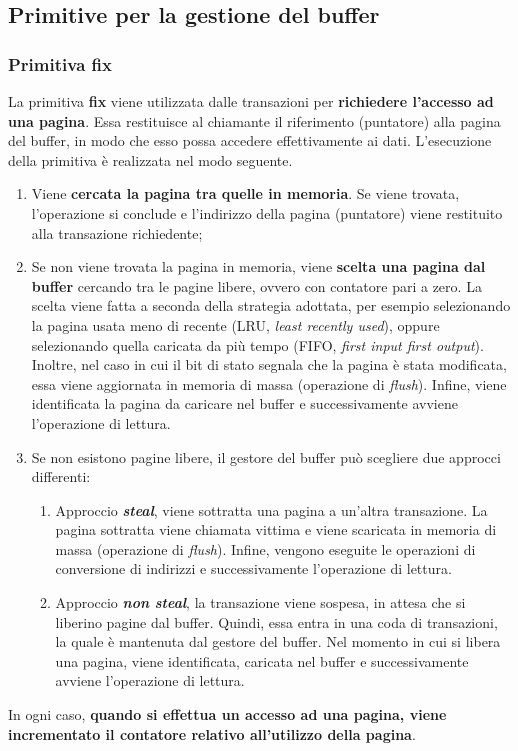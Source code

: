 \documentclass[a4paper]{article}
\begin{document}
	\subsection{Primitive per la gestione del buffer}
	
	\subsubsection{Primitiva \textsf{fix}}
	
	La primitiva \textcolor{Red3}{\textbf{\textsf{fix}}} viene utilizzata dalle transazioni per \textbf{richiedere l'accesso ad una pagina}. Essa restituisce al chiamante il riferimento (puntatore) alla pagina del buffer, in modo che esso possa accedere effettivamente ai dati. L'esecuzione della primitiva è realizzata nel modo seguente.
	\begin{enumerate}
		\item Viene \textbf{cercata la pagina tra quelle in memoria}. Se viene trovata, l'operazione si conclude e l'indirizzo della pagina (puntatore) viene restituito alla transazione richiedente;
		
		\item Se non viene trovata la pagina in memoria, viene \textbf{scelta una pagina dal buffer} cercando tra le pagine libere, ovvero con contatore pari a zero. La scelta viene fatta a seconda della strategia adottata, per esempio selezionando la pagina usata meno di recente (LRU, \emph{least recently used}), oppure selezionando quella caricata da più tempo (FIFO, \emph{first input first output}). Inoltre, nel caso in cui il bit di stato segnala che la pagina è stata modificata, essa viene aggiornata in memoria di massa (operazione di \emph{flush}). Infine, viene identificata la pagina da caricare nel buffer e successivamente avviene l'operazione di lettura.
		
		\item Se non esistono pagine libere, il gestore del buffer può scegliere due approcci differenti:
		\begin{enumerate}
			\item Approccio \textbf{\emph{steal}}, viene sottratta una pagina a un'altra transazione. La pagina sottratta viene chiamata vittima e viene scaricata in memoria di massa (operazione di \emph{flush}). Infine, vengono eseguite le operazioni di conversione di indirizzi e successivamente l'operazione di lettura.
			
			\item Approccio \textbf{\emph{non steal}}, la transazione viene sospesa, in attesa che si liberino pagine dal buffer. Quindi, essa entra in una coda di transazioni, la quale è mantenuta dal gestore del buffer. Nel momento in cui si libera una pagina, viene identificata, caricata nel buffer e successivamente avviene l'operazione di lettura.
		\end{enumerate}
	\end{enumerate}
	In ogni caso, \textbf{quando si effettua un accesso ad una pagina, viene incrementato il contatore relativo all'utilizzo della pagina}.\newpage
	
\end{document}
